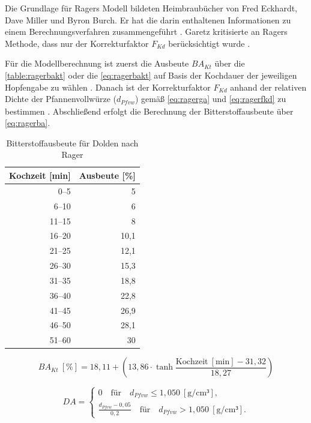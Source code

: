 \documentclass[a4paper,parskip=half]{scrartcl}
\newcommand{\BAKt}{{\mathit{BA}}_{\mathit{Kt}}}
\newcommand{\umin}{\:[\textrm{min}]}
\newcommand{\uden}{\:[\text{g/cm³}]}
\newcommand{\uper}{\:[\text{\%}]}
\newcommand{\FKd}{F_{\mathit{Kd}}}
\newcommand{\dPfvw}{d_\mathit{Pfvw}}
\begin{document}
Die Grundlage für Ragers Modell bildeten Heimbraubücher von Fred Eckhardt,
Dave Miller und Byron Burch. Er hat die darin enthaltenen Informationen
zu einem Berechnungsverfahren zusammengeführt \parencite[53]{Rager1990}. 
Garetz kritisierte an Ragers Methode, dass nur der Korrekturfaktor
$\FKd$ berücksichtigt wurde \parencite[134]{Garetz1994}.

Für die Modellberechnung ist zuerst die Ausbeute $\BAKt$ über die \autoref{table:ragerbakt}
oder die \autoref{eq:ragerbakt} auf Basis der Kochdauer der jeweiligen Hopfengabe
zu wählen \parencite{Steinmeyer2021}.
Danach ist der Korrekturfaktor $\FKd$ anhand der relativen Dichte der
Pfannenvollwürze ($\dPfvw$) gemäß \autoref{eq:ragerga} und \autoref{eq:ragerfkd}
zu bestimmen \parencite[53]{Rager1990}.
Abschließend erfolgt die Berechnung der Bitterstoffausbeute über \autoref{eq:ragerba}.

\begin{table}[H]
\centering
\begin{tabular}{rr}
\toprule
\multicolumn{1}{c}{\textbf{Kochzeit [min]}} & \multicolumn{1}{c}{\textbf{Ausbeute [\%]}} \\
\midrule
0–5             & 5 \\
6–10            & 6 \\
11–15           & 8 \\
16–20           & 10,1 \\
21–25           & 12,1 \\
26–30           & 15,3 \\
31–35           & 18,8 \\
36–40           & 22,8 \\
41–45           & 26,9 \\
46–50           & 28,1 \\
51–60           & 30 \\
\bottomrule
\end{tabular}
\caption{Bitterstoffausbeute für Dolden nach Rager \parencite[54]{Rager1990}}
\label{table:ragerbakt}
\end{table}

\begin{equation}
\BAKt \uper = 18,11 + \left(13,86 \cdot \tanh{\frac{\text{Kochzeit} \umin - 31,32}{18,27}}\right)
\label{eq:ragerbakt}
\end{equation}


\begin{equation}
\mathit{DA} = \begin{cases}
0 \quad \text{für} \quad d_{\mathit{Pfvw}} \le 1,050 \uden, \\
\frac{d_{\mathit{Pfvw}} - 0,05}{0,2} \quad \text{für} \quad d_{\mathit{Pfvw}} > 1,050 \uden.
\end{cases}
\label{eq:ragerga}
\end{equation}
\end{document}
